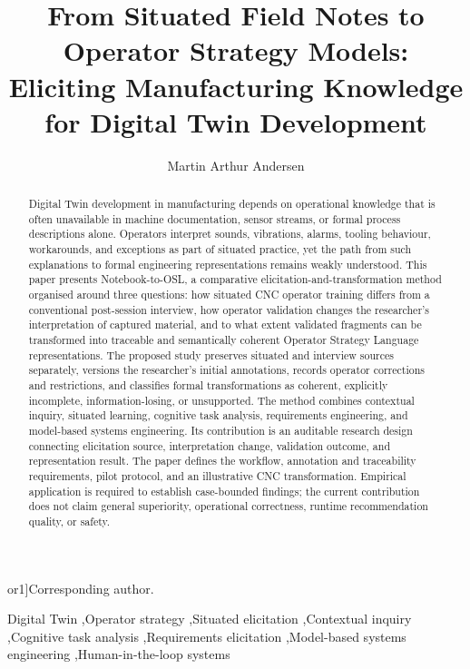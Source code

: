 \documentclass[preprint,12pt]{elsarticle}
\def\corref#1{}%
\def\cortext#1#2{}%
\begin{document}
\begin{frontmatter}

\title{From Situated Field Notes to Operator Strategy Models: Eliciting Manufacturing Knowledge for Digital Twin Development}

\author[hiost]{Martin Arthur Andersen\corref{cor1}}
\cortext[cor1]{Corresponding author.}

\address[hiost]{Østfold University College, Halden, Norway}

\begin{abstract}
Digital Twin development in manufacturing depends on operational knowledge that is often unavailable in machine documentation, sensor streams, or formal process descriptions alone. Operators interpret sounds, vibrations, alarms, tooling behaviour, workarounds, and exceptions as part of situated practice, yet the path from such explanations to formal engineering representations remains weakly understood. This paper presents Notebook-to-OSL, a comparative elicitation-and-transformation method organised around three questions: how situated CNC operator training differs from a conventional post-session interview, how operator validation changes the researcher's interpretation of captured material, and to what extent validated fragments can be transformed into traceable and semantically coherent Operator Strategy Language representations. The proposed study preserves situated and interview sources separately, versions the researcher's initial annotations, records operator corrections and restrictions, and classifies formal transformations as coherent, explicitly incomplete, information-losing, or unsupported. The method combines contextual inquiry, situated learning, cognitive task analysis, requirements engineering, and model-based systems engineering. Its contribution is an auditable research design connecting elicitation source, interpretation change, validation outcome, and representation result. The paper defines the workflow, annotation and traceability requirements, pilot protocol, and an illustrative CNC transformation. Empirical application is required to establish case-bounded findings; the current contribution does not claim general superiority, operational correctness, runtime recommendation quality, or safety.
\end{abstract}

\begin{keyword}
Digital Twin \sep Operator strategy \sep Situated elicitation \sep Contextual inquiry \sep Cognitive task analysis \sep Requirements elicitation \sep Model-based systems engineering \sep Human-in-the-loop systems
\end{keyword}

\end{frontmatter}
\end{document}

